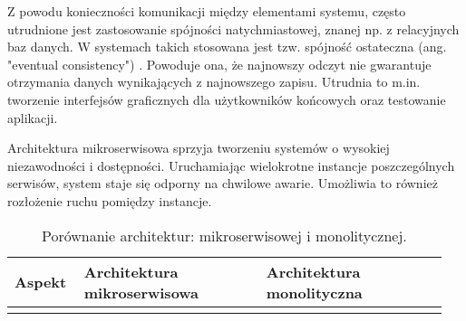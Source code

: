 Z powodu konieczności komunikacji między elementami systemu, często utrudnione jest zastosowanie spójności natychmiastowej, znanej np. z relacyjnych baz danych. W systemach takich stosowana jest tzw. spójność ostateczna (ang. "eventual consistency") \cite{eventual_consistency}. Powoduje ona, że najnowszy odczyt nie gwarantuje otrzymania danych wynikających z najnowszego zapisu. Utrudnia to m.in. tworzenie interfejsów graficznych dla użytkowników końcowych oraz testowanie aplikacji.

Architektura mikroserwisowa sprzyja tworzeniu systemów o wysokiej niezawodności i dostępności. Uruchamiając wielokrotne instancje poszczególnych serwisów, system staje się odporny na chwilowe awarie. Umożliwia to również rozłożenie ruchu pomiędzy instancje.

\begin{longtable}{| m{0.15\linewidth} | m{0.4\linewidth} | m{0.4\linewidth} |}
    \caption{Porównanie architektur: mikroserwisowej i monolitycznej.}
    \label{table:architektura_porownanie} \\

    \hline
    Aspekt & Architektura mikroserwisowa & Architektura monolityczna \\ \hline\hline \endfirsthead \endfoot
    \hline \endlastfoot


\end{longtable}
